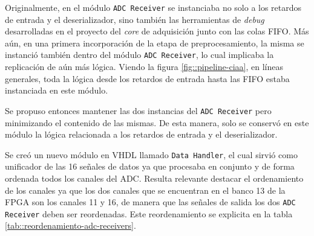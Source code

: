\documentclass[../../main.tex]{subfiles}
\begin{document}
Originalmente, en el módulo \texttt{ADC Receiver} se instanciaba no solo a los retardos de entrada y el deserializador, sino también las herramientas de \textit{debug} desarrolladas en el proyecto del \textit{core} de adquisición junto con las colas FIFO. Más aún, en una primera incorporación de la etapa de preprocesamiento, la misma se instanció también dentro del módulo \texttt{ADC Receiver}, lo cual implicaba la replicación de aún más lógica. Viendo la figura \ref{fig::pipeline-ciaa}, en líneas generales, toda la lógica desde los retardos de entrada hasta las FIFO estaba instanciada en este módulo.

Se propuso entonces mantener las dos instancias del \texttt{ADC Receiver} pero minimizando el contenido de las mismas. De esta manera, solo se conservó en este módulo la lógica relacionada a los retardos de entrada y el deserializador.

Se creó un nuevo módulo en VHDL llamado \texttt{Data Handler}, el cual sirvió como unificador de las 16 señales de datos ya que procesaba en conjunto y de forma ordenada todos los canales del ADC. Resulta relevante destacar el ordenamiento de los canales ya que los dos canales que se encuentran en el banco 13 de la FPGA son los canales 11 y 16, de manera que las señales de salida los dos \texttt{ADC Receiver} deben ser reordenadas. Este reordenamiento se explicita en la tabla \ref{tab::reordenamiento-adc-receivers}.
\end{document}
